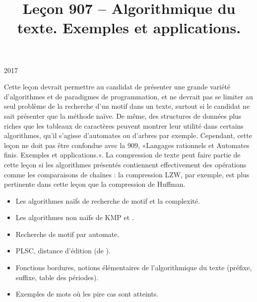 \documentclass{agregfiche}
\title{Leçon 907 -- Algorithmique du texte. Exemples et applications.}
\begin{document}
\maketitle

\secrapports

\begin{rapport}{2017}

    Cette leçon devrait permettre au candidat de présenter une grande variété d’algorithmes et de paradigmes de programmation, et ne devrait pas se limiter au seul problème de la recherche d’un motif dans un texte, surtout si le candidat ne sait présenter que la méthode naïve. De même, des structures de données plus riches que les tableaux de caractères peuvent montrer leur utilité dans certains algorithmes, qu’il s’agisse d’automates ou d’arbres par exemple. Cependant, cette leçon ne doit pas être confondue avec la 909, «Langages rationnels et Automates finis. Exemples et applications.». La compression de texte peut faire partie de cette leçon si les algorithmes présentés contiennent effectivement des opérations comme les comparaisons de chaînes : la compression LZW, par exemple, est plus pertinente dans cette leçon que la compression de Huffman.

\end{rapport}

\secindispensables

\begin{itemize}
    \item Les algorithmes naïfs de recherche de motif et la complexité.
    \item Les algorithmes non naïfs de KMP et .
    \item Recherche de motif par automate.

\end{itemize}

\secasavoir
\begin{itemize}

	\item PLSC, distance d'édition (de ).
	\item Fonctions bordures, notions élémentaires de l'algorithmique du texte (préfixe, suffixe, table des périodes).
	\item Exemples de mots où les pire cas sont atteints.
\end{itemize}

\secidees
\end{document}
